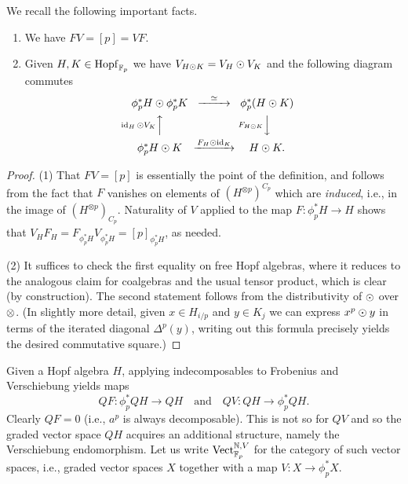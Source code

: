 We recall the following important facts.
\begin{lemma} \label{lemm:FV-basics}
\begin{enumerate}
\item We have $FV = [p] = VF$.
\item Given $H, K \in \mathrm{Hopf}_{\mathbb{F}_p}$ we have $V_{H \odot K} = V_H \odot V_K$ and the following diagram commutes
\begin{equation*}
\begin{CD}
\phi_p^*H \hotimes \phi_p^*K @>{\wequi}>> \phi_p^*(H \hotimes K) \\
@A{\id_H \hotimes V_K}AA                   @V{F_{H \hotimes K}}VV \\
\phi_p^* H \hotimes K @>{F_H \hotimes \id_K}>> H \hotimes K.
\end{CD}
\end{equation*}
\end{enumerate}
\end{lemma}
\begin{proof}
(1) That $FV = [p]$ is essentially the point of the definition, and follows from the fact that $F$ vanishes on elements of $(H^{\otimes p})^{C_p}$ which are \emph{induced}, i.e., in the image of $(H^{\otimes p})_{C_p}$.
Naturality of $V$ applied to the map $F: \phi_p^* H \to H$ shows that $V_H F_H = F_{\phi_p^* H} V_{\phi_p^* H} = [p]_{\phi_p^* H}$, as needed.

(2) It suffices to check the first equality on free Hopf algebras, where it reduces to the analogous claim for coalgebras and the usual tensor product, which is clear (by construction).
The second statement follows from the distributivity of $\odot$ over $\otimes$.
(In slightly more detail, given $x \in H_{i/p}$  and $y \in K_j$ we can express $x^p \odot y$ in terms of the iterated diagonal $\Delta^p(y)$, writing out this formula precisely yields the desired commutative square.)
\end{proof}

Given a Hopf algebra $H$, applying indecomposables to Frobenius and Verschiebung yields maps \[ QF: \phi_p^* QH \to QH \quad\text{and}\quad QV: QH \to \phi_p^* QH. \]
Clearly $QF = 0$ (i.e., $a^p$ is always decomposable).
This is not so for $QV$ and so the graded vector space $QH$ acquires an additional structure, namely the Verschiebung endomorphism.
Let us write $\mathrm{Vect}_{\mathbb{F}_p}^{\mathbb{N},V}$ for the category of such vector spaces, i.e., graded vector spaces $X$ together with a map $V: X \to \phi_p^* X$.

